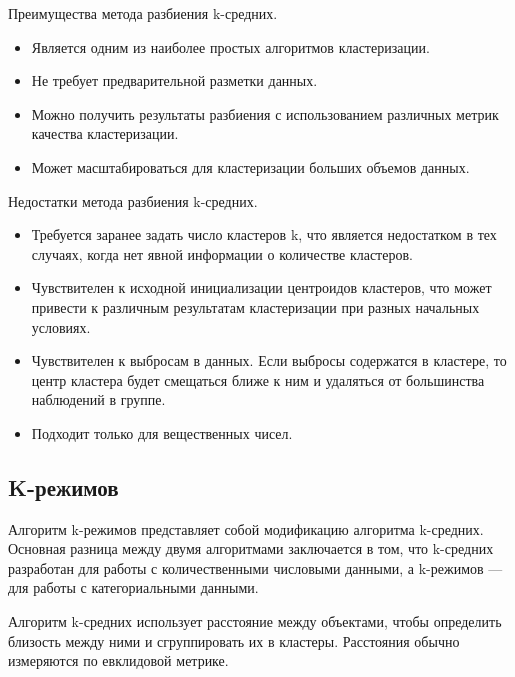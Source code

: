 Преимущества метода разбиения k-средних.

\begin{itemize}
    \item Является одним из наиболее простых алгоритмов кластеризации.
    \item Не требует предварительной разметки данных.
    \item Можно получить результаты разбиения с использованием различных метрик качества кластеризации.
    \item Может масштабироваться для кластеризации больших объемов данных.
\end{itemize}

Недостатки метода разбиения k-средних.

\begin{itemize}
    \item Требуется заранее задать число кластеров k, что является недостатком в тех случаях, когда нет явной информации о количестве кластеров.
    \item Чувствителен к исходной инициализации центроидов кластеров, что может привести к различным результатам кластеризации при разных начальных условиях.
    \item Чувствителен к выбросам в данных. Если выбросы содержатся в кластере, то центр кластера будет смещаться ближе к ним и удаляться от большинства наблюдений в группе.
    \item Подходит только для вещественных чисел.
\end{itemize}



\subsection{K-режимов}


Алгоритм k-режимов \cite{KmodesСlustering} представляет собой модификацию алгоритма k-средних.
Основная разница между двумя алгоритмами заключается в том, что k-средних разработан для работы с количественными числовыми данными, а k-режимов --- для работы с категориальными данными.

Алгоритм k-средних использует расстояние между объектами, чтобы определить близость между ними и сгруппировать их в кластеры. Расстояния обычно измеряются по евклидовой метрике.

